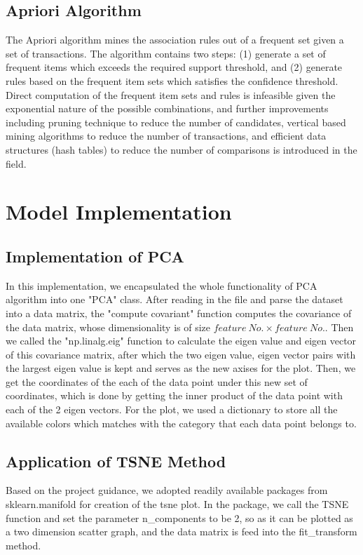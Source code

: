 \documentclass[fleqn]{llncs}
\begin{document}
\subsection{Apriori Algorithm} The Apriori algorithm mines the association rules out of a frequent set given a set of transactions. The algorithm contains two steps: (1) generate a set of frequent items which exceeds the required support threshold, and (2) generate rules based on the frequent item sets which satisfies the confidence threshold. Direct computation of the frequent item sets and rules is infeasible given the exponential nature of the possible combinations, and further improvements including pruning technique to reduce the number of candidates, vertical based mining algorithms to reduce the number of transactions, and efficient data structures (hash tables) to reduce the number of comparisons is introduced in the field.




\section{Model Implementation} 

\subsection{Implementation of PCA} In this implementation, we encapsulated the whole functionality of PCA algorithm into one "PCA" class. After reading in the file and parse the dataset into a data matrix, the "compute covariant" function computes the covariance of the data matrix, whose dimensionality is of size $feature\ No. \times feature\ No.$. Then we called the "np.linalg.eig" function to calculate the eigen value and eigen vector of this covariance matrix, after which the two {eigen value, eigen vector} pairs with the largest eigen value is kept and serves as the new axises for the plot. Then, we get the coordinates of the each of the data point under this new set of coordinates, which is done by getting the inner product of the data point with each of the 2 eigen vectors. For the plot, we used a dictionary to store all the available colors which matches with the category that each data point belongs to.


\subsection{Application of TSNE Method} Based on the project guidance, we adopted readily available packages from sklearn.manifold for creation of the tsne plot. In the package, we call the TSNE function and set the parameter n\_components to be 2, so as it can be plotted as a two dimension scatter graph, and the data matrix is feed into the fit\_transform method. 
\end{document}
